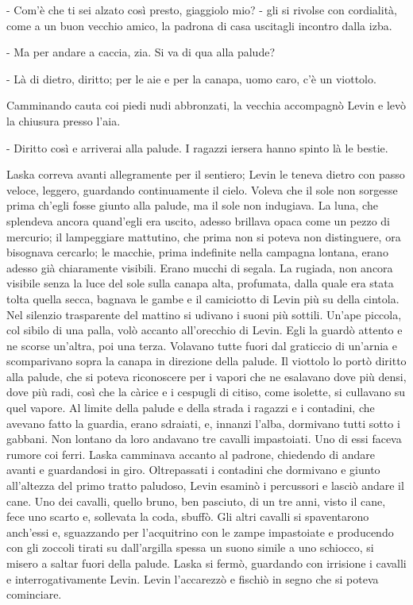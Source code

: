 - Com'è che ti sei alzato così presto, giaggiolo mio? - gli si rivolse con cordialità, come a un buon vecchio amico, la padrona di casa uscitagli incontro dalla izba. 

- Ma per andare a caccia, zia. Si va di qua alla palude? 

- Là di dietro, diritto; per le aie e per la canapa, uomo caro, c'è un viottolo. 

Camminando cauta coi piedi nudi abbronzati, la vecchia accompagnò Levin e levò la chiusura presso l'aia. 

- Diritto così e arriverai alla palude. I ragazzi iersera hanno spinto là le bestie. 

Laska correva avanti allegramente per il sentiero; Levin le teneva dietro con passo veloce, leggero, guardando continuamente il cielo. Voleva che il sole non sorgesse prima ch'egli fosse giunto alla palude, ma il sole non indugiava. La luna, che splendeva ancora quand'egli era uscito, adesso brillava opaca come un pezzo di mercurio; il lampeggiare mattutino, che prima non si poteva non distinguere, ora bisognava cercarlo; le macchie, prima indefinite nella campagna lontana, erano adesso già chiaramente visibili. Erano mucchi di segala. La rugiada, non ancora visibile senza la luce del sole sulla canapa alta, profumata, dalla quale era stata tolta quella secca, bagnava le gambe e il camiciotto di Levin più su della cintola. Nel silenzio trasparente del mattino si udivano i suoni più sottili. Un'ape piccola, col sibilo di una palla, volò accanto all'orecchio di Levin. Egli la guardò attento e ne scorse un'altra, poi una terza. Volavano tutte fuori dal graticcio di un'arnia e scomparivano sopra la canapa in direzione della palude. Il viottolo lo portò diritto alla palude, che si poteva riconoscere per i vapori che ne esalavano dove più densi, dove più radi, così che la càrice e i cespugli di citiso, come isolette, si cullavano su quel vapore. Al limite della palude e della strada i ragazzi e i contadini, che avevano fatto la guardia, erano sdraiati, e, innanzi l'alba, dormivano tutti sotto i gabbani. Non lontano da loro andavano tre cavalli impastoiati. Uno di essi faceva rumore coi ferri. Laska camminava accanto al padrone, chiedendo di andare avanti e guardandosi in giro. Oltrepassati i contadini che dormivano e giunto all'altezza del primo tratto paludoso, Levin esaminò i percussori e lasciò andare il cane. Uno dei cavalli, quello bruno, ben pasciuto, di un tre anni, visto il cane, fece uno scarto e, sollevata la coda, sbuffò. Gli altri cavalli si spaventarono anch'essi e, sguazzando per l'acquitrino con le zampe impastoiate e producendo con gli zoccoli tirati su dall'argilla spessa un suono simile a uno schiocco, si misero a saltar fuori della palude. Laska si fermò, guardando con irrisione i cavalli e interrogativamente Levin. Levin l'accarezzò e fischiò in segno che si poteva cominciare. 

